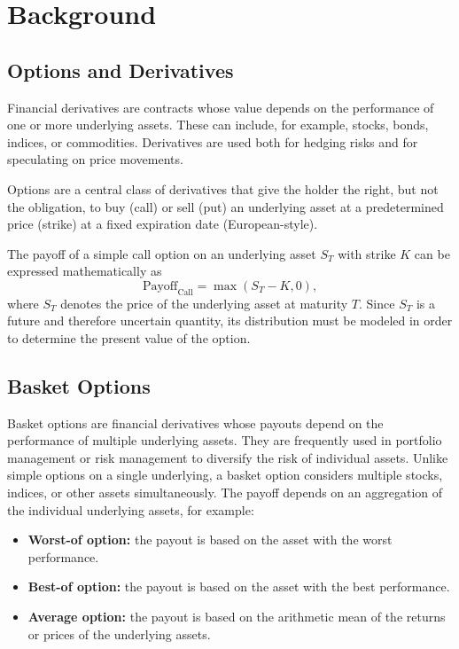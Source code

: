 \chapter{Background}
\label{sec:background}

\section{Options and Derivatives}
\label{sec:bg-options}

Financial derivatives are contracts whose value depends on the performance of one or more underlying assets. These can include, for example, stocks, bonds, indices, or commodities. Derivatives are used both for hedging risks and for speculating on price movements.

Options are a central class of derivatives that give the holder the right, but not the obligation, to buy (call) or sell (put) an underlying asset at a predetermined price (strike) at a fixed expiration date (European-style).

The payoff of a simple call option on an underlying asset $S_T$ with strike $K$ can be expressed mathematically as
\begin{equation}
\text{Payoff}_{\text{Call}} = \max(S_T - K, 0),
\end{equation}
where $S_T$ denotes the price of the underlying asset at maturity $T$. 
Since $S_T$ is a future and therefore uncertain quantity, its distribution must be modeled in order to determine the present value of the option.

\section{Basket Options}
\label{sec:bg-basket-options}

Basket options are financial derivatives whose payouts depend on the performance of multiple underlying assets. They are frequently used in portfolio management or risk management to diversify the risk of individual assets. Unlike simple options on a single underlying, a basket option considers multiple stocks, indices, or other assets simultaneously. The payoff depends on an aggregation of the individual underlying assets, for example:

\begin{itemize}
    \item \textbf{Worst-of option:} the payout is based on the asset with the worst performance.
    \item \textbf{Best-of option:} the payout is based on the asset with the best performance.
    \item \textbf{Average option:} the payout is based on the arithmetic mean of the returns or prices of the underlying assets.
\end{itemize}

